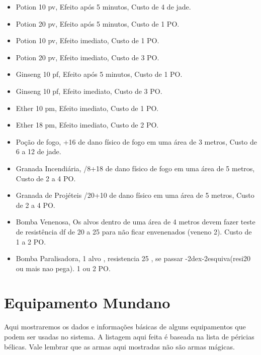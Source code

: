 \begin{itemize}

	\item Potion 10 pv, Efeito após 5 minutos, Custo de 4 de jade.

	\item Potion 20 pv, Efeito após 5 minutos, Custo de 1 PO.

	\item Potion 10 pv, Efeito imediato, Custo de 1 PO.

	\item Potion 20 pv, Efeito imediato, Custo de 3 PO.

	\item Ginseng 10 pf, Efeito após 5 minutos, Custo de 1 PO.

	\item Ginseng 10 pf, Efeito imediato, Custo de 3 PO.

	\item Ether 10 pm, Efeito imediato, Custo de 1 PO.

	\item Ether 18 pm, Efeito imediato, Custo de 2 PO.

	\item Poção de fogo, +16 de dano físico de fogo em uma área de 3 metros, Custo de 6 a 12 de jade.

	\item Granada Incendiária, /8+18 de dano físico de fogo em uma área de 5 metros, Custo de 2 a 4 PO.

	\item Granada de Projéteis /20+10 de dano físico em uma área de 5 metros, Custo de 2 a 4 PO.

	\item Bomba Venenosa, Os alvos dentro de uma área de 4 metros devem fazer teste de resistência df de 20 a 25 para não ficar envenenados (veneno 2). Custo de 1 a 2 PO.

		\item Bomba Paralisadora, 1 alvo , resistencia 25 , se passar -2dex-2esquiva(resi20 ou mais nao pega). 1 ou 2 PO.

\end{itemize}

\section{Equipamento Mundano}
Aqui mostraremos os dados e informações básicas de alguns equipamentos que podem ser usadas no sistema. A listagem aqui feita é baseada na lista de péricias bélicas. Vale lembrar que as armas aqui mostradas não são armas mágicas.

